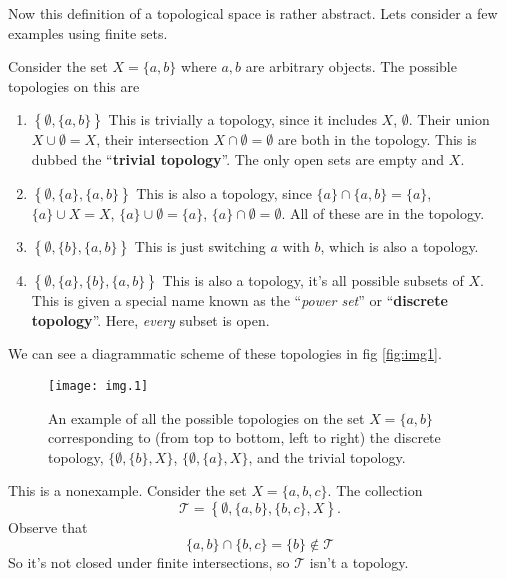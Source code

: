 Now this definition of a topological space is rather
abstract. Lets consider a few examples using finite sets.
\begin{ex}
Consider the set $X=\{a,b\}$ where $a,b$ are arbitrary
objects. The possible topologies on this are
\begin{enumerate}
\item $\left\{\emptyset,\{a,b\}\right\}$ This is trivially a
  topology, since it includes $X$, $\emptyset$. Their union
  $X\cup\emptyset=X$, their intersection
  $X\cap\emptyset=\emptyset$ are both in the topology. This is
  dubbed the ``\textbf{trivial topology}''. The only open sets are
  empty and $X$.
\item $\left\{\emptyset,\{a\},\{a,b\}\right\}$ This is also a
  topology, since $\{a\}\cap\{a,b\}=\{a\}$, $\{a\}\cup X=X$,
  $\{a\}\cup\emptyset=\{a\}$, $\{a\}\cap\emptyset=\emptyset$. All
  of these are in the topology.
\item $\left\{\emptyset,\{b\},\{a,b\}\right\}$ This is just
  switching $a$ with $b$, which is also a topology.
\item $\left\{\emptyset,\{a\},\{b\},\{a,b\}\right\}$ This is also
  a topology, it's all possible subsets of $X$. This is given a
  special name known as the ``\emph{power set}'' or
  ``\textbf{discrete topology}''. Here, \emph{every} subset is open.
\end{enumerate}  
We can see a diagrammatic scheme of these topologies in fig \eqref{fig:img1}.
\end{ex}

\begin{figure}[t]
\texttt{[image: img.1]}
\caption{An example of all the possible topologies on the set
  $X=\{a, b\}$ corresponding to (from top to bottom, left to right)
  the discrete topology, $\{\emptyset,\{b\},X\}$,
  $\{\emptyset,\{a\},X\}$, and the trivial topology.}\label{fig:img1}
\end{figure}

\begin{ex}
This is a nonexample. Consider the set $X=\{a,b,c\}$. The collection
\begin{equation}
\mathcal{T} = \left\{\emptyset,\{a,b\},\{b,c\},X\right\}.
\end{equation}
Observe that
\begin{equation}
\{a,b\}\cap\{b,c\}=\{b\}\notin\mathcal{T}
\end{equation}
So it's not closed under finite intersections, so $\mathcal{T}$
isn't a topology.
\end{ex}

